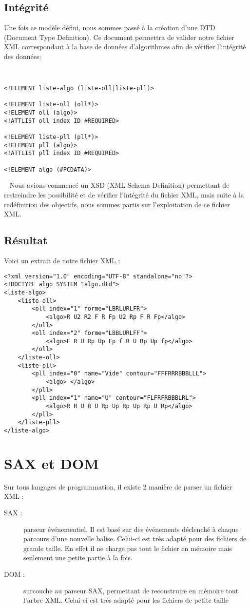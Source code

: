 \subsection{Intégrité}
Une fois ce modèle défini, nous sommes passé à la création d'une DTD (Document Type Definition). Ce document permettra de valider notre fichier XML correspondant à la base de données d'algorithmes afin de vérifier l'intégrité des données:

~

\lstset{language=XML}
\begin{lstlisting}
<!ELEMENT liste-algo (liste-oll|liste-pll)>

<!ELEMENT liste-oll (oll*)>
<!ELEMENT oll (algo)>
<!ATTLIST oll index ID #REQUIRED>

<!ELEMENT liste-pll (pll*)>
<!ELEMENT pll (algo)>
<!ATTLIST pll index ID #REQUIRED>

<!ELEMENT algo (#PCDATA)>
\end{lstlisting}

~
Nous avions commencé un XSD (XML Schema Definition) permettant de restreindre les possibilité et de vérifier l'intégrité du fichier XML, mais suite à la redéfinition des objectifs, nous sommes partis sur l'exploitation de ce fichier XML.

\newpage
\subsection{Résultat}
Voici un extrait de notre fichier XML :

\begin{lstlisting}
<?xml version="1.0" encoding="UTF-8" standalone="no"?>
<!DOCTYPE algo SYSTEM "algo.dtd">
<liste-algo>
    <liste-oll>
        <oll index="1" forme="LBRLURLFR">
            <algo>R U2 R2 F R Fp U2 Rp F R Fp</algo>
        </oll>
        <oll index="2" forme="LBBLURLFF">
            <algo>F R U Rp Up Fp f R U Rp Up fp</algo>
        </oll>
    </liste-oll>
    <liste-pll>
        <pll index="0" name="Vide" contour="FFFRRRBBBLLL">
            <algo> </algo>
        </pll>
        <pll index="1" name="U" contour="FLFRFRBBBLRL">
            <algo>R R U R U Rp Up Rp Up Rp U Rp</algo>
        </pll>
    </liste-pll>
</liste-algo>
\end{lstlisting}


\section{SAX et DOM}
Sur tous langages de programmation, il existe 2 manière de parser un fichier XML :
\begin{description}
\item [SAX : ]parseur événementiel. Il est basé sur des événements déclenché à chaque parcours d'une nouvelle balise. Celui-ci est très adapté pour des fichiers de grande taille. En effet il ne charge pas tout le fichier en mémoire mais seulement une petite partie à la fois.
\item [DOM : ]surcouche au parseur SAX, permettant de reconstruire en mémoire tout l'arbre XML. Celui-ci est très adapté pour les fichiers de petite taille 
\end{description}

